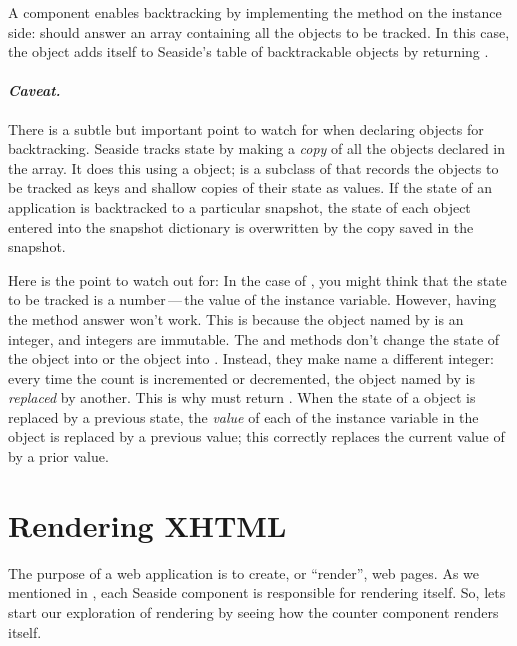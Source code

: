 \documentclass[a4paper,10pt,twoside]{book}
\begin{document}
A component enables backtracking by implementing the  method on the instance side: 
 should answer an array containing all the objects to be tracked.
In this case, the  object adds itself to Seaside's table of backtrackable objects by returning .

\paragraph{\emph{Caveat.}}
There is a subtle but important point to watch for when declaring objects for backtracking.
Seaside tracks state by making a \emph{copy} of all the objects declared in the  array.
It does this using a  object;  is a subclass of  that records the objects to be tracked as keys and shallow copies of their state as values.
If the state of an application is backtracked to a particular snapshot, the state of each object entered into the snapshot dictionary is overwritten by the copy saved in the snapshot.

Here is the point to watch out for:
In the case of , you might think that the state to be tracked is a number\,---\,the value of the  instance variable.
However, having the  method answer  won't work.  
This is because the object named by  is an integer, and integers are immutable.
The  and  methods don't change the state of the object  into  or the object  into .
Instead, they make  name a different integer: 
every time the count is incremented or decremented, the object named by  is \emph{replaced} by another.
This is why  must return .
When the state of a \mbox{} object is replaced by a previous state, the \emph{value} of each of the instance variable in the object is replaced by a previous value; this correctly replaces the current value of  by a prior value. 

\section{Rendering XHTML}

The purpose of a web application is to create, or ``render'', web pages.  As we mentioned in , each Seaside component is responsible for rendering itself.  
So, lets start our exploration of rendering by seeing how the counter component renders itself.
\end{document}
